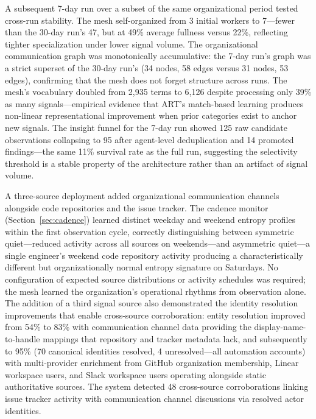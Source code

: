 \documentclass[11pt,a4paper]{article}
\begin{document}
A subsequent 7-day run over a subset of the same organizational period tested cross-run stability. The mesh self-organized from 3 initial workers to 7---fewer than the 30-day run's 47, but at 49\% average fullness versus 22\%, reflecting tighter specialization under lower signal volume. The organizational communication graph was monotonically accumulative: the 7-day run's graph was a strict superset of the 30-day run's (34 nodes, 58 edges versus 31 nodes, 53 edges), confirming that the mesh does not forget structure across runs. The mesh's vocabulary doubled from 2,935 terms to 6,126 despite processing only 39\% as many signals---empirical evidence that ART's match-based learning produces non-linear representational improvement when prior categories exist to anchor new signals. The insight funnel for the 7-day run showed 125 raw candidate observations collapsing to 95 after agent-level deduplication and 14 promoted findings---the same 11\% survival rate as the full run, suggesting the selectivity threshold is a stable property of the architecture rather than an artifact of signal volume.

A three-source deployment added organizational communication channels alongside code repositories and the issue tracker. The cadence monitor (Section~\ref{sec:cadence}) learned distinct weekday and weekend entropy profiles within the first observation cycle, correctly distinguishing between symmetric quiet---reduced activity across all sources on weekends---and asymmetric quiet---a single engineer's weekend code repository activity producing a characteristically different but organizationally normal entropy signature on Saturdays. No configuration of expected source distributions or activity schedules was required; the mesh learned the organization's operational rhythms from observation alone. The addition of a third signal source also demonstrated the identity resolution improvements that enable cross-source corroboration: entity resolution improved from 54\% to 83\% with communication channel data providing the display-name-to-handle mappings that repository and tracker metadata lack, and subsequently to 95\% (70 canonical identities resolved, 4 unresolved---all automation accounts) with multi-provider enrichment from GitHub organization membership, Linear workspace users, and Slack workspace users operating alongside static authoritative sources. The system detected 48 cross-source corroborations linking issue tracker activity with communication channel discussions via resolved actor identities.
\end{document}
